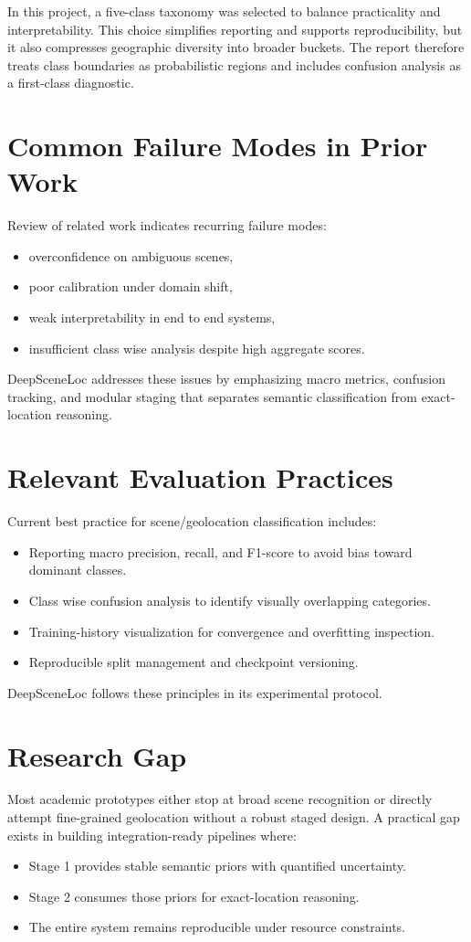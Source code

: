 In this project, a five-class taxonomy was selected to balance practicality and interpretability. This choice simplifies reporting and supports reproducibility, but it also compresses geographic diversity into broader buckets. The report therefore treats class boundaries as probabilistic regions and includes confusion analysis as a first-class diagnostic.

\section{Common Failure Modes in Prior Work}
Review of related work indicates recurring failure modes:
\begin{itemize}
\item overconfidence on ambiguous scenes,
\item poor calibration under domain shift,
\item weak interpretability in end to end systems,
\item insufficient class wise analysis despite high aggregate scores.
\end{itemize}

DeepSceneLoc addresses these issues by emphasizing macro metrics, confusion tracking, and modular staging that separates semantic classification from exact-location reasoning.

\section{Relevant Evaluation Practices}
Current best practice for scene/geolocation classification includes:
\begin{itemize}
\item Reporting macro precision, recall, and F1-score to avoid bias toward dominant classes.
\item Class wise confusion analysis to identify visually overlapping categories.
\item Training-history visualization for convergence and overfitting inspection.
\item Reproducible split management and checkpoint versioning.
\end{itemize}

DeepSceneLoc follows these principles in its experimental protocol.

\section{Research Gap}
Most academic prototypes either stop at broad scene recognition or directly attempt fine-grained geolocation without a robust staged design. A practical gap exists in building integration-ready pipelines where:
\begin{itemize}
\item Stage 1 provides stable semantic priors with quantified uncertainty.
\item Stage 2 consumes those priors for exact-location reasoning.
\item The entire system remains reproducible under resource constraints.
\end{itemize}

